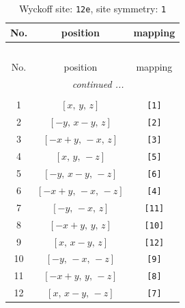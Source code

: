 \documentclass[fleqn,8pt]{jsarticle}
\begin{document}
\begin{longtable}{ccc}
\caption{Wyckoff site: {\tt 12e}, site symmetry: {\tt 1}}
 \\
 \hline \hline
No. & position & mapping \\ \hline \endfirsthead

\multicolumn{2}{l}{\tablename\ \thetable{}} \\
 \hline \hline
No. & position & mapping \\ \hline \endhead

 \hline \hline
\multicolumn{2}{r}{\footnotesize\it continued ...} \\ \endfoot

 \hline \hline
\multicolumn{2}{r}{} \\ \endlastfoot

1 & $\left[ x,\, y,\, z \right]$ & {\tt [1]} \\ \hline
2 & $\left[ - y,\, x - y,\, z \right]$ & {\tt [2]} \\ \hline
3 & $\left[ - x + y,\, - x,\, z \right]$ & {\tt [3]} \\ \hline
4 & $\left[ x,\, y,\, - z \right]$ & {\tt [5]} \\ \hline
5 & $\left[ - y,\, x - y,\, - z \right]$ & {\tt [6]} \\ \hline
6 & $\left[ - x + y,\, - x,\, - z \right]$ & {\tt [4]} \\ \hline
7 & $\left[ - y,\, - x,\, z \right]$ & {\tt [11]} \\ \hline
8 & $\left[ - x + y,\, y,\, z \right]$ & {\tt [10]} \\ \hline
9 & $\left[ x,\, x - y,\, z \right]$ & {\tt [12]} \\ \hline
10 & $\left[ - y,\, - x,\, - z \right]$ & {\tt [9]} \\ \hline
11 & $\left[ - x + y,\, y,\, - z \right]$ & {\tt [8]} \\ \hline
12 & $\left[ x,\, x - y,\, - z \right]$ & {\tt [7]} \\
\end{longtable}
\end{document}
